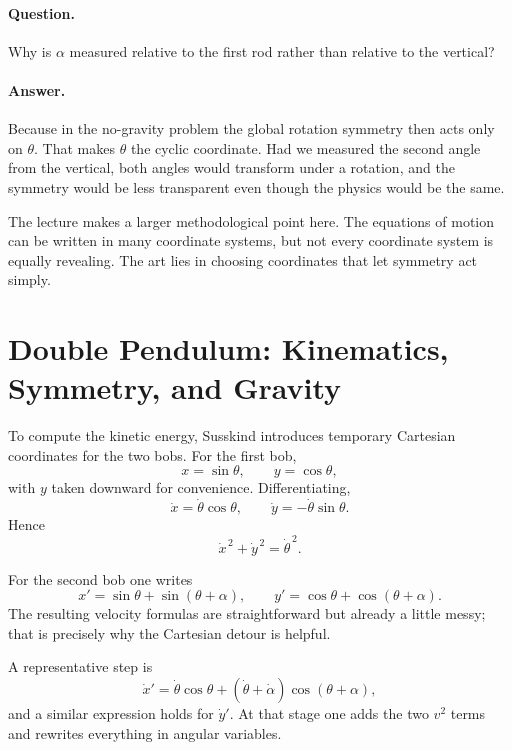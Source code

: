 \paragraph{Question.} Why is \(\alpha\) measured relative to the first rod rather than relative to the vertical?

\paragraph{Answer.} Because in the no-gravity problem the global rotation symmetry then acts only on \(\theta\). That makes \(\theta\) the cyclic coordinate. Had we measured the second angle from the vertical, both angles would transform under a rotation, and the symmetry would be less transparent even though the physics would be the same.

The lecture makes a larger methodological point here. The equations of motion can be written in many coordinate systems, but not every coordinate system is equally revealing. The art lies in choosing coordinates that let symmetry act simply.

\section{Double Pendulum: Kinematics, Symmetry, and Gravity}

To compute the kinetic energy, Susskind introduces temporary Cartesian coordinates for the two bobs. For the first bob,
\begin{equation}
x=\sin\theta,\qquad y=\cos\theta,
\end{equation}
with \(y\) taken downward for convenience. Differentiating,
\begin{equation}
\dot x=\dot\theta\cos\theta,\qquad \dot y=-\dot\theta\sin\theta.
\end{equation}
Hence
\begin{equation}
\dot x^{\,2}+\dot y^{\,2}=\dot\theta^{\,2}.
\end{equation}

For the second bob one writes
\begin{equation}
x'=\sin\theta+\sin(\theta+\alpha),\qquad
y'=\cos\theta+\cos(\theta+\alpha).
\end{equation}
The resulting velocity formulas are straightforward but already a little messy; that is precisely why the Cartesian detour is helpful.

A representative step is
\begin{equation}
\dot x'=\dot\theta\cos\theta+(\dot\theta+\dot\alpha)\cos(\theta+\alpha),
\end{equation}
and a similar expression holds for \(\dot y'\). At that stage one adds the two \(v^2\) terms and rewrites everything in angular variables.

